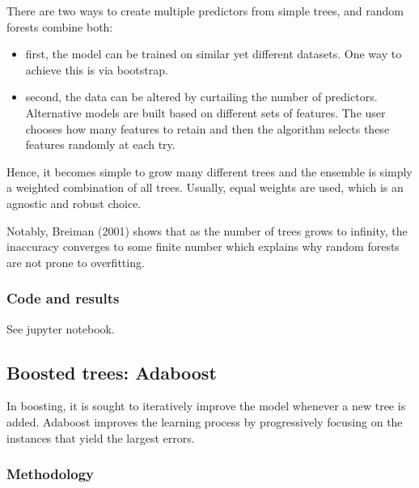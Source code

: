 There are two ways to create multiple predictors from simple trees, and random forests combine both: 
\begin{itemize}
    \item first, the model can be trained on similar yet different datasets. One way to achieve this is via bootstrap.
    \item second, the data can be altered by curtailing the number of predictors. Alternative models are built based on different sets of features. The user chooses how many features to retain and then the algorithm selects these features randomly at each try.
\end{itemize}

Hence, it becomes simple to grow many different trees and the ensemble is simply a weighted combination of all trees. Usually, equal weights are used, which is an agnostic and robust choice.

Notably, Breiman (2001) shows that as the number of trees grows to infinity, the inaccuracy converges to some finite number which explains why random forests are not prone to overfitting.

\subsubsection{Code and results}

See jupyter notebook.

\subsection{Boosted trees: Adaboost}


In boosting, it is sought to iteratively improve the model whenever a new tree is added. Adaboost improves the learning process by progressively focusing on the instances that yield the largest errors.

\subsubsection{Methodology}

